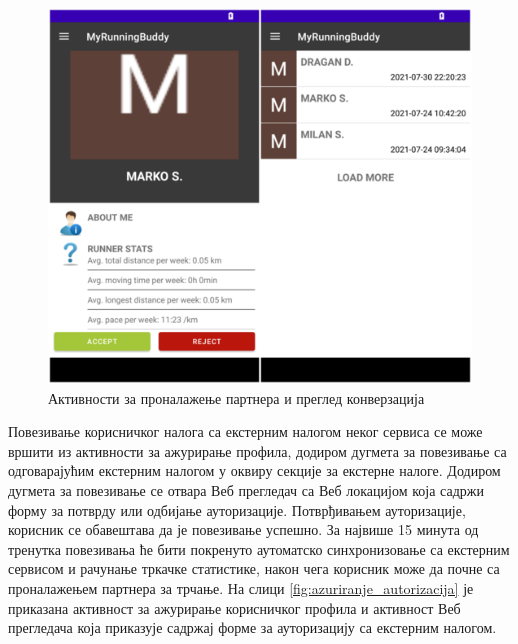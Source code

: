 \documentclass[12pt,oneside]{memoir}
\begin{document}
\begin{figure}[!ht]
  \centering
  \includegraphics[scale=0.7]{slike/pretraga-konverzacija.png}
  \caption{Активности за проналажење партнера и преглед конверзација}
  \label{fig:pretraga_konverzacija}
\end{figure}

Повезивање корисничког налога са екстерним налогом неког сервиса се може вршити из активности за ажурирање профила, додиром дугмета за повезивање са одговарајућим екстерним налогом у оквиру секције за екстерне налоге. Додиром дугмета за повезивање се отвара Веб прегледач са Веб локацијом која садржи форму за потврду или одбијање ауторизације. Потврђивањем ауторизације, корисник се обавештава да је повезивање успешно. За највише 15 минута од тренутка повезивања ће бити покренуто аутоматско синхронизовање са екстерним сервисом и рачунање тркачке статистике, након чега корисник може да почне са проналажењем партнера за трчање. На слици \ref{fig:azuriranje_autorizacija} је приказана активност за ажурирање корисничког профила и активност Веб прегледача која приказује садржај форме за ауторизацију са екстерним налогом.
\end{document}
